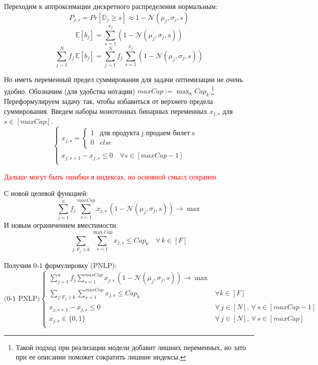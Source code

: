 \documentclass[12pt, reqno]{article}
\theoremstyle{definition}
\theoremstyle{definition}
\theoremstyle{definition}
\theoremstyle{definition}
\theoremstyle{definition}
\theoremstyle{definition}
\theoremstyle{definition}
\theoremstyle{definition}
\theoremstyle{definition}
\begin{document}
		Переходим к аппроксимации дискретного распределения нормальным:
		$$P_{j,s} = Pr[\mathds{D}_j \geq s] \approx 1 - \mathcal{N}(\mu_j, \sigma_j, s)$$
		$$\mathds{E}[b_j] = \sum\limits_{s = 1}^{x_j} (1 - \mathcal{N}(\mu_j, \sigma_j, s))$$
		$$\sum\limits^N_{j = 1} f_j\,\mathds{E}[b_j] = \sum\limits^N_{j = 1} f_j\,\sum\limits_{s = 1}^{x_j} (1 - \mathcal{N}(\mu_j, \sigma_j, s))$$
		
		Но иметь переменный предел суммирования для задачи оптимизации не очень удобно. Обозначим (для удобства нотации) $maxCap := \max_k Cap_k$.\footnote{Такой подход при реализации модели добавит лишних переменных, но зато при ее описании поможет сократить лишние индексы.} Переформулируем задачу так, чтобы избавиться от верхнего предела суммирования. Введем наборы монотонных бинарных переменных $x_{j,s}$ для $s \in [maxCap]$.
		$$
		\begin{cases}
			x_{j,s} =
		\begin{cases}
			1 & \text{для продукта j продаем билет s}\\
			0 & else\\
		\end{cases} & \\
		x_{j,s + 1} - x_{j, s} \leq 0\quad \forall s \in [maxCap - 1] & \\
		\end{cases}
		$$
		
		\textcolor{red}{Дальше могут быть ошибки в индексах, но основной смысл сохранен.}
		
		С новой целевой функцией:
		$$\sum\limits^n_{j = 1} f_j \sum\limits^{maxCap}_{s = 1} x_{j, s}\,(1 - \mathcal{N}(\mu_j, \sigma_j, s)) \rightarrow \max$$
		И новым ограничением вместимости:
		$$\sum\limits_{j : F_j \ni k} \sum\limits^{\max Cap}_{s = 1} x_{j, s} \leq Cap_k \quad \forall\, k \in [F]$$
		
		Получим $0$-$1$ формулировку (PNLP):
		$$
		\text{(0-1 PNLP)}
		\begin{cases}
			\sum\limits^n_{j = 1} f_j \sum\limits^{maxCap}_{s = 1} x_{j, s}\,(1 - \mathcal{N}(\mu_j, \sigma_j, s)) \rightarrow \max & \\
			\sum\limits_{j : F_j \ni k} \sum\limits^{maxCap}_{s = 1} x_{j, s} \leq Cap_k & \forall k \in [F] \\
			x_{j,s + 1} - x_{j, s} \leq 0 \quad & \forall\, j \in [N],\, \forall\, s \in [maxCap - 1] \\
			x_{j, s} \in \{0, 1\} &  \forall\, j \in [N],\, \forall\, s \in [maxCap] \\
		\end{cases}
		$$
		
\end{document}
